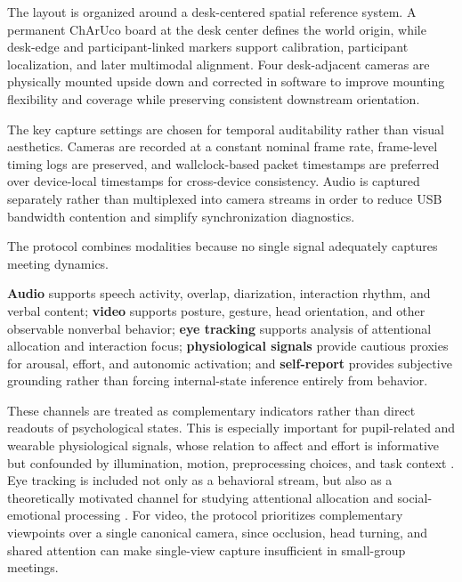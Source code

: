 \documentclass[runningheads]{llncs}
\begin{document}
The layout is organized around a desk-centered spatial reference system. A permanent ChArUco board at the desk center defines the world origin, while desk-edge and participant-linked markers support calibration, participant localization, and later multimodal alignment. Four desk-adjacent cameras are physically mounted upside down and corrected in software to improve mounting flexibility and coverage while preserving consistent downstream orientation.

The key capture settings are chosen for temporal auditability rather than visual aesthetics. Cameras are recorded at a constant nominal frame rate, frame-level timing logs are preserved, and wallclock-based packet timestamps are preferred over device-local timestamps for cross-device consistency. Audio is captured separately rather than multiplexed into camera streams in order to reduce USB bandwidth contention and simplify synchronization diagnostics.


\noindent The protocol combines modalities because no single signal adequately captures meeting dynamics.

\textbf{Audio} supports speech activity, overlap, diarization, interaction rhythm, and verbal content; \textbf{video} supports posture, gesture, head orientation, and other observable nonverbal behavior; \textbf{eye tracking} supports analysis of attentional allocation and interaction focus; \textbf{physiological signals} provide cautious proxies for arousal, effort, and autonomic activation; and \textbf{self-report} provides subjective grounding rather than forcing internal-state inference entirely from behavior.

These channels are treated as complementary indicators rather than direct readouts of psychological states. This is especially important for pupil-related and wearable physiological signals, whose relation to affect and effort is informative but confounded by illumination, motion, preprocessing choices, and task context \cite{mathot2018_pupillometry_review,posadaquintero2020_eda_review}. Eye tracking is included not only as a behavioral stream, but also as a theoretically motivated channel for studying attentional allocation and social-emotional processing \cite{seikavandi2023gaze,j2024modeling}. For video, the protocol prioritizes complementary viewpoints over a single canonical camera, since occlusion, head turning, and shared attention can make single-view capture insufficient in small-group meetings.
\end{document}
